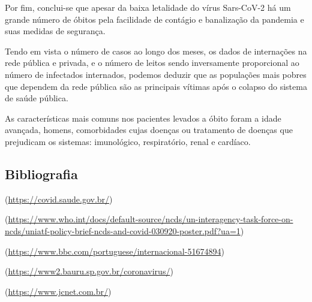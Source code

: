 \documentclass[
]{article}
\begin{document}
Por fim, conclui-se que apesar da baixa letalidade do vírus Sars-CoV-2
há um grande número de óbitos pela facilidade de contágio e banalização
da pandemia e suas medidas de segurança.

Tendo em vista o número de casos ao longo dos meses, os dados de
internações na rede pública e privada, e o número de leitos sendo
inversamente proporcional ao número de infectados internados, podemos
deduzir que as populações mais pobres que dependem da rede pública são
as principais vítimas após o colapso do sistema de saúde pública.

As características mais comuns nos pacientes levados a óbito foram a
idade avançada, homens, comorbidades cujas doenças ou tratamento de
doenças que prejudicam os sistemas: imunológico, respiratório, renal e
cardíaco.

\hypertarget{bibliografia}{%
\subsection{Bibliografia}\label{bibliografia}}

(\url{https://covid.saude.gov.br/})

(\url{https://www.who.int/docs/default-source/ncds/un-interagency-task-force-on-ncds/uniatf-policy-brief-ncds-and-covid-030920-poster.pdf?ua=1})

(\url{https://www.bbc.com/portuguese/internacional-51674894})

(\url{https://www2.bauru.sp.gov.br/coronavirus/})

(\url{https://www.jcnet.com.br/})
\end{document}
